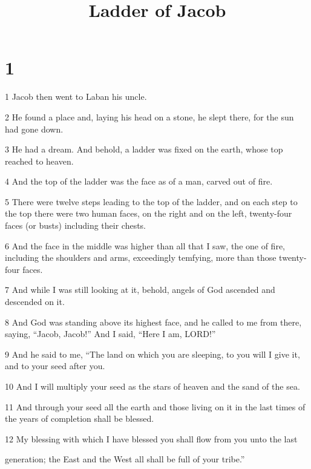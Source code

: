 


\title{Ladder of Jacob}

\chapter{1}

\par 1 Jacob then went to Laban his uncle. 

\par 2 He found a place and, laying his head on a stone, he slept there, for the sun had gone down. 

\par 3 He had a dream. And behold, a ladder was fixed on the earth, whose top reached to heaven. 

\par 4 And the top of the ladder was the face as of a man, carved out of fire. 

\par 5 There were twelve steps leading to the top of the ladder, and on each step to the top there were two human faces, on the right and on the left, twenty-four faces (or busts) including their chests. 

\par 6 And the face in the middle was higher than all that I saw, the one of fire, including the shoulders and arms, exceedingly temfying, more than those twenty-four faces. 

\par 7 And while I was still looking at it, behold, angels of God ascended and descended on it. 

\par 8 And God was standing above its highest face, and he called to me from there, saying, “Jacob, Jacob!” And I said, “Here I am, LORD!”

\par 9 And he said to me, “The land on which you are sleeping, to you will I give it, and to your seed after you. 

\par 10 And I will multiply your seed as the stars of heaven and the sand of the sea. 

\par 11 And through your seed all the earth and those living on it in the last times of the years of completion shall be blessed.

\par 12 My blessing with which I have blessed you shall flow from you unto the last
\par generation; the East and the West all shall be full of your tribe.”

